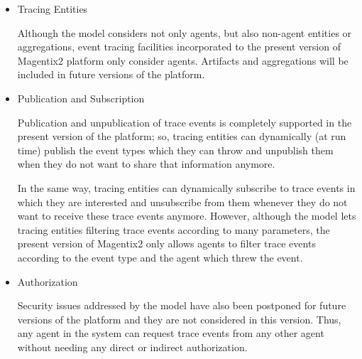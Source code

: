 		\begin{itemize}

		\item{Tracing Entities}

			Although the model considers not only agents, but also non-agent entities or aggregations,
			event tracing facilities incorporated to the present version of Magentix2 platform only
			consider agents. Artifacts and aggregations will be included in future versions of the
			platform.

		\item{Publication and Subscription}

			Publication and unpublication of trace events is completely supported in the present version
			of the platform; so, tracing entities can dynamically (at run time) publish the event types
			which they can throw and unpublish them when they do not want to share that information
			anymore.

			In the same way, tracing entities can dynamically subscribe to trace events in which they are
			interested and unsubscribe from them whenever they do not want to receive these trace
			events anymore. However, although the model lets tracing entities filtering trace events
			according to many parameters, the present version of Magentix2 only allows agents to filter
			trace events according to the event type and the agent which threw the event.


		\item{Authorization}

			Security issues addressed by the model have also been postponed for future versions of the
			platform and they are not considered in this version. Thus, any agent in the system can
			request trace events from any other agent without needing any direct or indirect
			authorization.

		\end{itemize}


